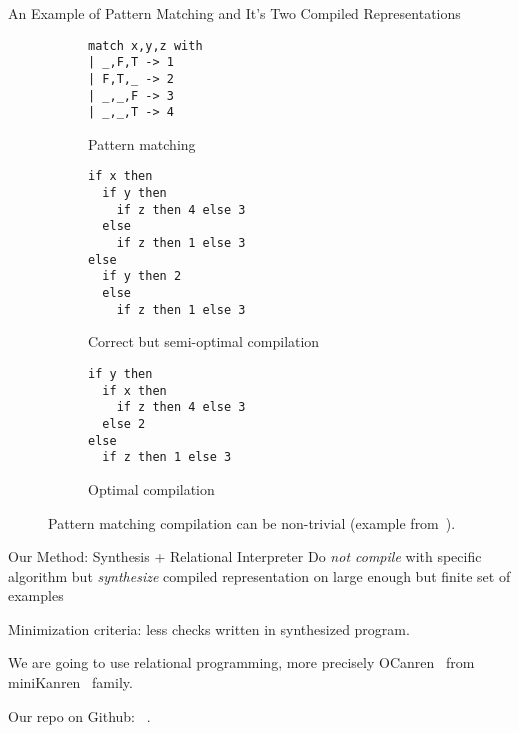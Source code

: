 \documentclass[aspectratio=169
  , xcolor={svgnames}
  , hyperref={ colorlinks,citecolor=Blue
             , linkcolor=DarkRed,urlcolor=DarkBlue}
  , russian
  ]{beamer}
\begin{document}
\begin{frame}[fragile]{An Example of Pattern Matching and It's Two Compiled Representations}
\begin{figure}[ht]
\begin{subfigure}[b]{0.25\linewidth}
\begin{lstlisting}
match x,y,z with
| _,F,T -> 1
| F,T,_ -> 2
| _,_,F -> 3
| _,_,T -> 4
\end{lstlisting}
\caption{Pattern matching}
\end{subfigure}
\hspace{0.5cm}
\begin{subfigure}[b]{0.32\linewidth}
\begin{lstlisting}
if x then
  if y then
    if z then 4 else 3
  else
    if z then 1 else 3
else
  if y then 2
  else
    if z then 1 else 3
\end{lstlisting}
\caption{Correct but semi-optimal compilation}
\label{fig:matching-example2}
\end{subfigure}
\hspace{0.5cm}
\begin{subfigure}[b]{0.3\linewidth}
\centering
\begin{lstlisting}
if y then
  if x then
    if z then 4 else 3
  else 2
else
  if z then 1 else 3
\end{lstlisting}
\caption{Optimal compilation}
\label{fig:matching-example3}
\end{subfigure}
\caption{Pattern matching compilation can be non-trivial (example from~\cite{maranget2008}).}
\label{fig:match-example}
\end{figure}
\end{frame}

\begin{frame}{Our Method: Synthesis + Relational Interpreter}
Do \emph{not compile} with specific algorithm but \emph{synthesize} compiled representation on large enough but finite set of examples
\vspace{1cm}

Minimization criteria: less checks written in synthesized program.
\vspace{1cm}

We are going to use relational programming, more precisely OCanren~\cite{OCanrenWeb} from miniKanren~\cite{MiniKanrenWeb} family.
\vspace{1cm}


Our repo on Github: ~\cite{Repo}.
\end{frame}
\end{document}

